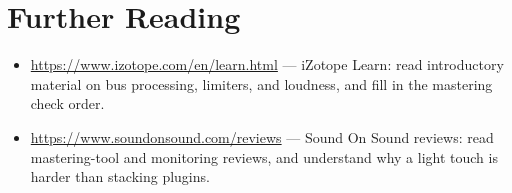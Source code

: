 \section*{Further Reading}
\begin{itemize}[leftmargin=1.5em]
\item \url{https://www.izotope.com/en/learn.html} — iZotope Learn: read introductory material on bus processing, limiters, and loudness, and fill in the mastering check order.
\item \url{https://www.soundonsound.com/reviews} — Sound On Sound reviews: read mastering-tool and monitoring reviews, and understand why a light touch is harder than stacking plugins.
\end{itemize}
